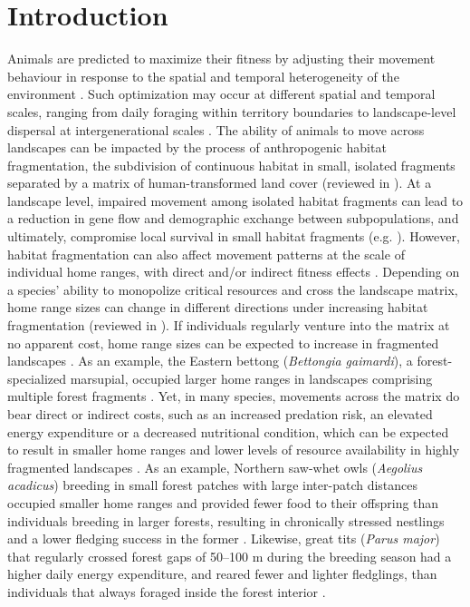 \documentclass[10pt, twoside]{book} %
\begin{document}
		
\clearpage
	
	\section{Introduction}
	
	
Animals are predicted to maximize their fitness by adjusting their movement behaviour in response to the spatial and temporal heterogeneity of the environment \citep{Nathan2008}. Such optimization may occur at different spatial and temporal scales, ranging from daily foraging within territory boundaries to landscape-level dispersal at intergenerational scales \citep{Jeltsch2013}. The ability of animals to move across landscapes can be impacted by the process of anthropogenic habitat fragmentation, the subdivision of continuous habitat in small, isolated fragments separated by a matrix of human-transformed land cover (reviewed in \citealt{Cosgrove2018, Fischer2007}). At a landscape level, impaired movement among isolated habitat fragments can lead to a reduction in gene flow and demographic exchange between subpopulations, and ultimately, compromise local survival in small habitat fragments (e.g. \citealt{Cooper2002, Delaney2010}). However, habitat fragmentation can also affect movement patterns at the scale of individual home ranges, with direct and/or indirect fitness effects \citep{Cosgrove2018}. Depending on a species' ability to monopolize critical resources and cross the landscape matrix, home range sizes can change in different directions under increasing habitat fragmentation (reviewed in \citealt{Harris2002}). If individuals regularly venture into the matrix at no apparent cost, home range sizes can be expected to increase in fragmented landscapes \citep{Hansbauer2008, Beasley2010, Snell2020}. As an example, the Eastern bettong (\textit{Bettongia gaimardi}), a forest-specialized marsupial, occupied larger home ranges in landscapes comprising multiple forest fragments \citep{Gardiner2019}. Yet, in many species, movements across the matrix do bear direct or indirect costs, such as an increased predation risk, an elevated energy expenditure or a decreased nutritional condition, which can be expected to result in smaller home ranges and lower levels of resource availability in highly fragmented landscapes \citep{Redpath1995, Doherty2003, Verbeylen2009}. As an example, Northern saw-whet owls (\textit{Aegolius acadicus}) breeding in small forest patches with large inter-patch distances occupied smaller home ranges and provided fewer food to their offspring than individuals breeding in larger forests, resulting in chronically stressed nestlings and a lower fledging success in the former \citep{Hinam2008}. Likewise, great tits (\textit{Parus major}) that regularly crossed forest gaps of 50--100 m during the breeding season had a higher daily energy expenditure, and reared fewer and lighter fledglings, than individuals that always foraged inside the forest interior \citep{Hinsley2000, Hinsley2008}.\\
\end{document}
